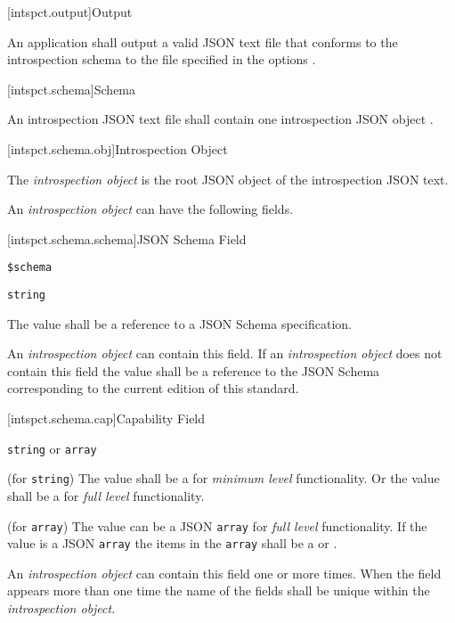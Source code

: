 [intspct.output]{Output}

\pnum
An application shall output a valid JSON text file that conforms to the
introspection schema  to the file specified in the options
.

[intspct.schema]{Schema}

\pnum
An introspection JSON text file shall contain one introspection JSON object
.

[intspct.schema.obj]{Introspection Object}

\pnum
The \emph{introspection object} is the root JSON object of the introspection
JSON text.

\pnum
An \emph{introspection object} can have the following fields.

[intspct.schema.schema]{JSON Schema Field}

\begin{itemdescr}

	\pnum
	\fldname
	\verb|$schema|

	\pnum
	\fldtype
	\verb|string|

	\pnum
	\fldval
	The value shall be a reference to a JSON Schema specification.

	\pnum
	\flddesc
	An \emph{introspection object} can contain this field.
	If an \emph{introspection object} does not contain this field the value
	shall be a reference to the JSON Schema corresponding to the current
	edition of this standard.

\end{itemdescr}

[intspct.schema.cap]{Capability Field}

\begin{itemdescr}

	\pnum
	\fldname
	 

	\pnum
	\fldtype
	\verb|string| or \verb|array|

	\pnum
	\fldval (for \verb|string|)
	The value shall be a  for \emph{minimum level}
	functionality.
	Or the value shall be a  for \emph{full level}
	functionality.

	\pnum
	\fldval (for \verb|array|)
	The value can be a JSON \verb|array| for \emph{full level} functionality.
	If the value is a JSON \verb|array| the items in the \verb|array| shall be a
	 or .
	
	\pnum
	\flddesc
	An \emph{introspection object} can contain this field one or more times.
	When the field appears more than one time the name of the fields shall be
	unique within the \emph{introspection object}.
  
\end{itemdescr}

